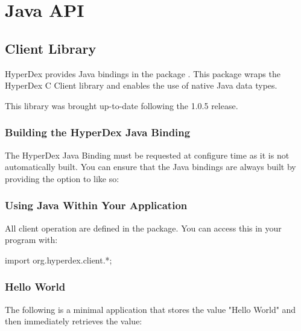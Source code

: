 \chapter{Java API}
\label{chap:api:java}

\section{Client Library}
\label{sec:api:java:client}

HyperDex provides Java bindings in the package .  This
package wraps the HyperDex C Client library and enables the use of native Java
data types.

This library was brought up-to-date following the 1.0.5 release.

\subsection{Building the HyperDex Java Binding}
\label{sec:api:java:building}

The HyperDex Java Binding must be requested at configure time as it is not
automatically built.  You can ensure that the Java bindings are always built by
providing the  option to  like
so:

\begin{consolecode}
\end{consolecode}

\subsection{Using Java Within Your Application}
\label{sec:api:java:using}

All client operation are defined in the  package.  You
can access this in your program with:

\begin{javacode}
import org.hyperdex.client.*;
\end{javacode}

\subsection{Hello World}
\label{sec:api:java:hello-world}

The following is a minimal application that stores the value "Hello World" and
then immediately retrieves the value:

